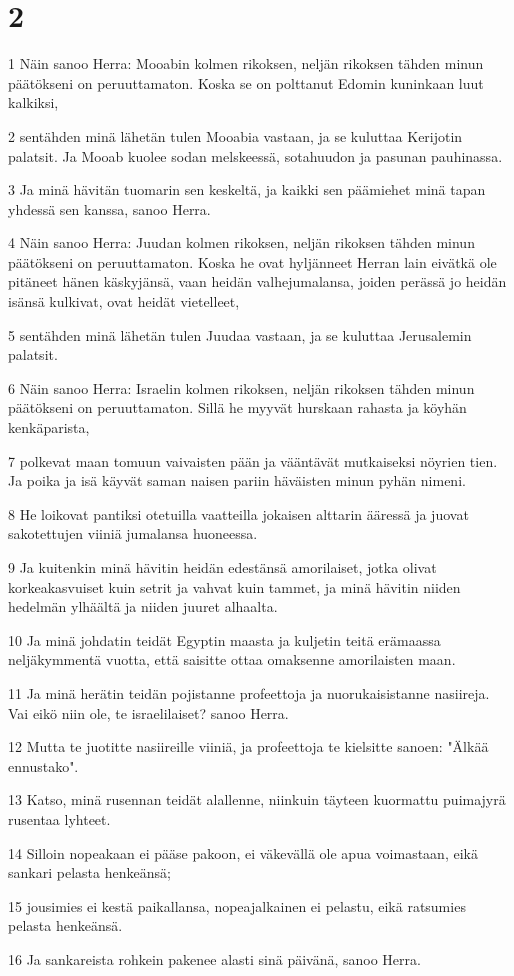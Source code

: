 \chapter{2}

\par 1 Näin sanoo Herra: Mooabin kolmen rikoksen, neljän rikoksen tähden minun päätökseni on peruuttamaton. Koska se on polttanut Edomin kuninkaan luut kalkiksi,
\par 2 sentähden minä lähetän tulen Mooabia vastaan, ja se kuluttaa Kerijotin palatsit. Ja Mooab kuolee sodan melskeessä, sotahuudon ja pasunan pauhinassa.
\par 3 Ja minä hävitän tuomarin sen keskeltä, ja kaikki sen päämiehet minä tapan yhdessä sen kanssa, sanoo Herra.
\par 4 Näin sanoo Herra: Juudan kolmen rikoksen, neljän rikoksen tähden minun päätökseni on peruuttamaton. Koska he ovat hyljänneet Herran lain eivätkä ole pitäneet hänen käskyjänsä, vaan heidän valhejumalansa, joiden perässä jo heidän isänsä kulkivat, ovat heidät vietelleet,
\par 5 sentähden minä lähetän tulen Juudaa vastaan, ja se kuluttaa Jerusalemin palatsit.
\par 6 Näin sanoo Herra: Israelin kolmen rikoksen, neljän rikoksen tähden minun päätökseni on peruuttamaton. Sillä he myyvät hurskaan rahasta ja köyhän kenkäparista,
\par 7 polkevat maan tomuun vaivaisten pään ja vääntävät mutkaiseksi nöyrien tien. Ja poika ja isä käyvät saman naisen pariin häväisten minun pyhän nimeni.
\par 8 He loikovat pantiksi otetuilla vaatteilla jokaisen alttarin ääressä ja juovat sakotettujen viiniä jumalansa huoneessa.
\par 9 Ja kuitenkin minä hävitin heidän edestänsä amorilaiset, jotka olivat korkeakasvuiset kuin setrit ja vahvat kuin tammet, ja minä hävitin niiden hedelmän ylhäältä ja niiden juuret alhaalta.
\par 10 Ja minä johdatin teidät Egyptin maasta ja kuljetin teitä erämaassa neljäkymmentä vuotta, että saisitte ottaa omaksenne amorilaisten maan.
\par 11 Ja minä herätin teidän pojistanne profeettoja ja nuorukaisistanne nasiireja. Vai eikö niin ole, te israelilaiset? sanoo Herra.
\par 12 Mutta te juotitte nasiireille viiniä, ja profeettoja te kielsitte sanoen: "Älkää ennustako".
\par 13 Katso, minä rusennan teidät alallenne, niinkuin täyteen kuormattu puimajyrä rusentaa lyhteet.
\par 14 Silloin nopeakaan ei pääse pakoon, ei väkevällä ole apua voimastaan, eikä sankari pelasta henkeänsä;
\par 15 jousimies ei kestä paikallansa, nopeajalkainen ei pelastu, eikä ratsumies pelasta henkeänsä.
\par 16 Ja sankareista rohkein pakenee alasti sinä päivänä, sanoo Herra.

